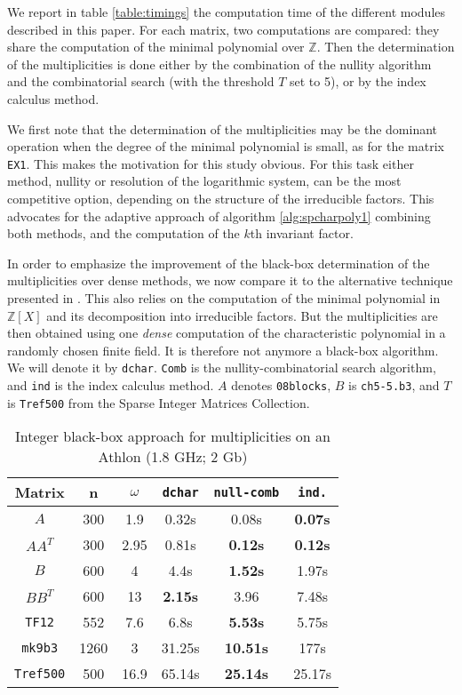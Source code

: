 \documentclass{article}
\newcommand{\Z}{\mathbb{Z}}
\begin{document}
We report in table \ref{table:timings} the computation time of the
different modules described in this paper. For each matrix, two computations are
compared: they share the computation of the minimal polynomial over $\Z$. Then
the determination of the multiplicities is done either by the combination of the
nullity algorithm and the combinatorial search (with the threshold $T$ set to 5), or by the index calculus method.

We first note that the determination of the multiplicities may be the dominant
operation when the degree of the minimal polynomial is small, as for the matrix
\texttt{EX1}. This makes the motivation for this study obvious.
For this task either method, nullity or resolution of the logarithmic system,
can be the most competitive option, depending on the structure of the irreducible
factors. This advocates for the adaptive approach of algorithm
\ref{alg:spcharpoly1} combining both methods, and the computation of the
$k$th invariant factor.

In order to emphasize the improvement of the black-box determination of the
multiplicities over dense methods, we now compare it to the alternative technique presented in
\cite[\S 4.2.2]{jgd:2005:charp}. This also relies on the computation of the
minimal polynomial in $\Z[X]$ and its decomposition into irreducible factors. But
the multiplicities are then obtained using one \emph{dense} computation of the characteristic
polynomial in a randomly chosen finite field. It is
therefore not anymore a black-box algorithm. 
We will denote it by \texttt{dchar}.  \texttt{Comb} is the nullity-combinatorial
search algorithm, and \texttt{ind} is the index calculus method. $A$ denotes \texttt{08blocks}, $B$ is \texttt{ch5-5.b3}, and $T$ is \texttt{Tref500} from the Sparse Integer Matrices Collection.

\begin{table}[htbp]
\begin{center}
\begin{tabular}{cccccc}
\toprule
Matrix & n & $\omega$ & \texttt{dchar} & \texttt{null-comb} &
\texttt{ind.}\\
\midrule
$A$ & 300 & 1.9  & 0.32s & 0.08s & \textbf{0.07s}\\
$AA^T$          & 300 & 2.95 & 0.81s & \textbf{0.12s} & \textbf{0.12s}\\
$B$   & 600 & 4    & 4.4s  & \textbf{1.52s} & 1.97s\\
$BB^T$          & 600 & 13   & \textbf{2.15s}  & 3.96  &7.48s \\
\texttt{TF12}         & 552 & 7.6  & 6.8s   & \textbf{5.53s} & 5.75s\\
\texttt{mk9b3}        & 1260 & 3   & 31.25s & \textbf{10.51s} & 177s \\ 
\texttt{Tref500}      & 500 & 16.9 & 65.14s & \textbf{25.14s} & 25.17s\\
\bottomrule
\end{tabular}
\end{center}
\caption{Integer black-box approach for 
  multiplicities on an Athlon (1.8 GHz; 2 Gb)}
\label{tab:ciavsbn}
\end{table}
\end{document}

